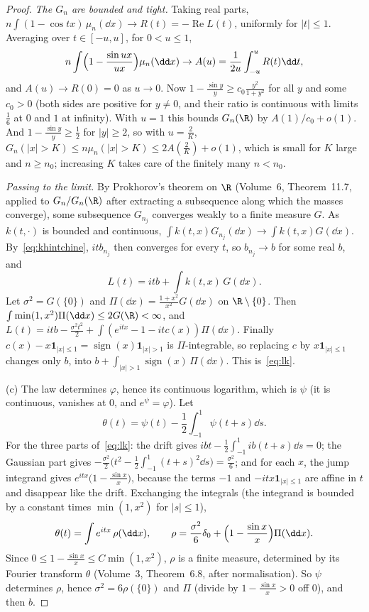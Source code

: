 \begin{proof}
\emph{The $G_n$ are bounded and tight.} Taking real parts, $n\int(1-\cos tx)\,\mu_n(\dd x)\to R(t)=-\operatorname{Re}L(t)$, uniformly for $|t|\le1$. Averaging
over $t\in[-u,u]$, for $0<u\le1$,
\[
n\int\Bigl(1-\frac{\sin ux}{ux}\Bigr)\mu_n(\dd x)\to A(u)=\frac1{2u}\int_{-u}^uR(t)\dd t,
\]
and $A(u)\to R(0)=0$ as $u\to0$. Now $1-\frac{\sin y}y\ge c_0\frac{y^2}{1+y^2}$ for all $y$ and some $c_0>0$ (both sides are positive for $y\ne0$, and their ratio
is continuous with limits $\frac16$ at $0$ and $1$ at infinity). With $u=1$ this bounds $G_n(\R)$ by $A(1)/c_0+o(1)$. And $1-\frac{\sin y}y\ge\frac12$ for $|y|\ge2$, so
with $u=\frac2K$, $G_n(|x|>K)\le n\mu_n(|x|>K)\le2A(\frac2K)+o(1)$, which is small for $K$ large and $n\ge n_0$; increasing $K$ takes care of the finitely
many $n<n_0$.

\emph{Passing to the limit.} By Prokhorov's theorem on $\R$ (Volume~6, Theorem~11.7, applied to $G_n/G_n(\R)$ after extracting a subsequence along which the
masses converge), some subsequence $G_{n_j}$ converges weakly to a finite measure $G$. As $k(t,\cdot)$ is bounded and continuous,
$\int k(t,x)G_{n_j}(\dd x)\to\int k(t,x)G(\dd x)$. By~\eqref{eq:khintchine}, $itb_{n_j}$ then converges for every $t$, so $b_{n_j}\to b$ for some real $b$, and
\[
L(t)=itb+\int k(t,x)\,G(\dd x).
\]
Let $\sigma^2=G(\{0\})$ and $\Pi(\dd x)=\frac{1+x^2}{x^2}G(\dd x)$ on $\R\setminus\{0\}$. Then $\int\min(1,x^2)\Pi(\dd x)\le2G(\R)<\infty$, and
$L(t)=itb-\frac{\sigma^2t^2}2+\int(e^{itx}-1-itc(x))\Pi(\dd x)$. Finally $c(x)-x\mathbf 1_{|x|\le1}=\operatorname{sign}(x)\mathbf 1_{|x|>1}$ is $\Pi$-integrable, so
replacing $c$ by $x\mathbf 1_{|x|\le1}$ changes only $b$, into $b+\int_{|x|>1}\operatorname{sign}(x)\,\Pi(\dd x)$. This is~\eqref{eq:lk}.

(c) The law determines $\varphi$, hence its continuous logarithm, which is $\psi$ (it is continuous, vanishes at $0$, and $e^\psi=\varphi$). Let
\[
\theta(t)=\psi(t)-\frac12\int_{-1}^1\psi(t+s)\dd s.
\]
For the three parts of~\eqref{eq:lk}: the drift gives $ibt-\frac12\int_{-1}^1ib(t+s)\dd s=0$; the Gaussian part gives
$-\frac{\sigma^2}2\bigl(t^2-\frac12\int_{-1}^1(t+s)^2\dd s\bigr)=\frac{\sigma^2}6$; and for each $x$, the jump integrand gives $e^{itx}\bigl(1-\frac{\sin x}x\bigr)$, because the
terms $-1$ and $-itx\mathbf 1_{|x|\le1}$ are affine in $t$ and disappear like the drift. Exchanging the integrals (the integrand is bounded by a constant times
$\min(1,x^2)$ for $|s|\le1$),
\[
\theta(t)=\int e^{itx}\,\rho(\dd x),\qquad\rho=\frac{\sigma^2}6\delta_0+\Bigl(1-\frac{\sin x}x\Bigr)\Pi(\dd x).
\]
Since $0\le1-\frac{\sin x}x\le C\min(1,x^2)$, $\rho$ is a finite measure, determined by its Fourier transform $\theta$ (Volume~3, Theorem~6.8, after normalisation).
So $\psi$ determines $\rho$, hence $\sigma^2=6\rho(\{0\})$ and $\Pi$ (divide by $1-\frac{\sin x}x>0$ off $0$), and then $b$.
\end{proof}

